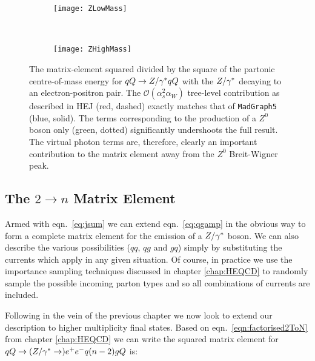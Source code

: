 		\begin{figure}[hbtp]
		        \centering
		        \begin{subfigure}[b]{0.82\textwidth}
		                \texttt{[image: ZLowMass]}
		                \caption{}
		                \label{fig:LowDileptonMass}
		        \end{subfigure}
		        ~
		        \begin{subfigure}[b]{0.82\textwidth}
		                \texttt{[image: ZHighMass]}
		                \caption{}
		                \label{fig:HighDileptonMass}
		        \end{subfigure}
		        \caption{The matrix-element squared divided by the square of the
		          partonic centre-of-mass energy for $qQ\to Z/\gamma^* qQ$ with the $Z/\gamma^*$ decaying
		          to an electron-positron pair.  The
		          $\mathcal{O}(\alpha_s^2 \alpha_W)$ tree-level contribution
		          as described in HEJ (red, dashed) exactly matches that of
		          \texttt{MadGraph5} (blue, solid).  The terms corresponding to the production
		          of a $Z^0$ boson only (green, dotted) significantly undershoots the
		          full result.  The
		          virtual photon terms are, therefore, clearly an important
		          contribution to the matrix element away from the $Z^0$ Breit-Wigner
		          peak.}
		        \label{fig:DileptonMass}
		\end{figure}

	\subsection{The $2\rightarrow n$ Matrix Element}

		Armed with eqn.~\eqref{eq:jsum} we can extend eqn.~\eqref{eq:qgamp} in the obvious way
		to form a complete matrix element for the emission of a $Z/\gamma^*$ boson.  We can also
		describe the various possibilities ($qq$, $qg$ and $gq$) simply by substituting
		the currents which apply in any given situation.  Of course, in practice we use
		the importance sampling techniques discussed in chapter \ref{chap:HEQCD} to
		randomly sample the possible incoming parton types and so all combinations of
		currents are included.

		Following in the vein of the previous chapter we now look to extend our description
		to higher multiplicity final states.  Based on eqn.~\eqref{eqn:factorised2ToN} from
		chapter \ref{chap:HEQCD} we can write the squared matrix element for
		$qQ\to (Z/\gamma^*\to ) e^+e^- q (n-2)g Q$ is:

